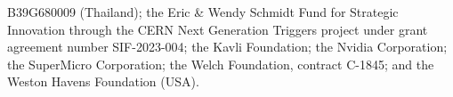 \begin{acknowledgments}
B39G680009 (Thailand); the Eric \& Wendy Schmidt Fund for Strategic Innovation through the CERN Next Generation Triggers project under grant agreement number SIF-2023-004; the Kavli Foundation; the Nvidia Corporation; the SuperMicro Corporation; the Welch Foundation, contract C-1845; and the Weston Havens Foundation (USA).
\end{acknowledgments}



